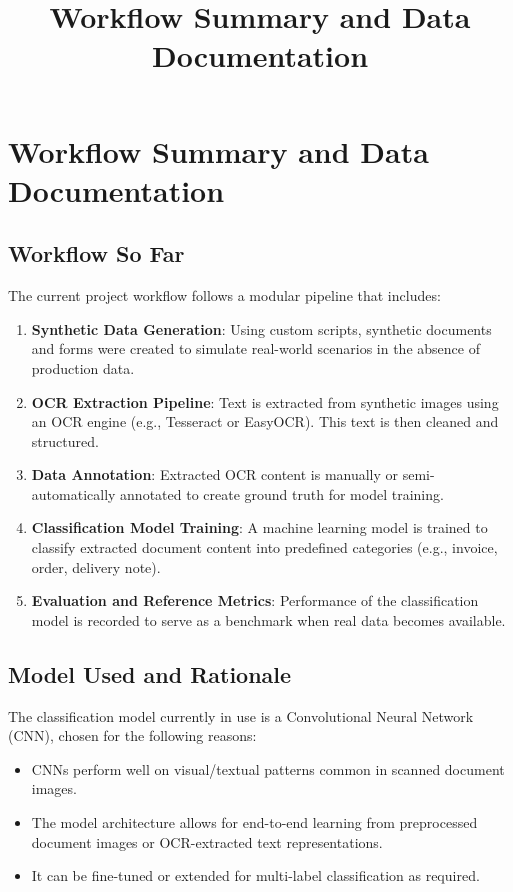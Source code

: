 \documentclass[11pt]{article}
\title{Workflow Summary and Data Documentation}
\author{}
\date{}
\begin{document}
\maketitle

\section{Workflow Summary and Data Documentation}

\subsection{Workflow So Far}

The current project workflow follows a modular pipeline that includes:

\begin{enumerate}
  \item \textbf{Synthetic Data Generation}: Using custom scripts, synthetic documents and forms were created to simulate real-world scenarios in the absence of production data.
  \item \textbf{OCR Extraction Pipeline}: Text is extracted from synthetic images using an OCR engine (e.g., Tesseract or EasyOCR). This text is then cleaned and structured.
  \item \textbf{Data Annotation}: Extracted OCR content is manually or semi-automatically annotated to create ground truth for model training.
  \item \textbf{Classification Model Training}: A machine learning model is trained to classify extracted document content into predefined categories (e.g., invoice, order, delivery note).
  \item \textbf{Evaluation and Reference Metrics}: Performance of the classification model is recorded to serve as a benchmark when real data becomes available.
\end{enumerate}

\subsection{Model Used and Rationale}

The classification model currently in use is a Convolutional Neural Network (CNN), chosen for the following reasons:

\begin{itemize}
  \item CNNs perform well on visual/textual patterns common in scanned document images.
  \item The model architecture allows for end-to-end learning from preprocessed document images or OCR-extracted text representations.
  \item It can be fine-tuned or extended for multi-label classification as required.
\end{itemize}
\end{document}
